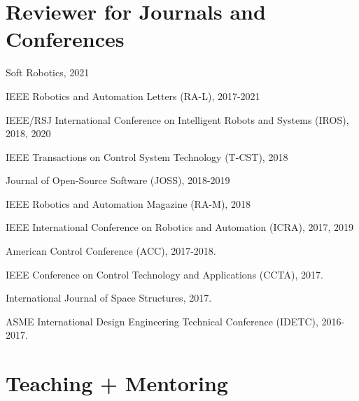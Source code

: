 \documentclass[letterpaper]{deedy-resume} %
\begin{document}
{\section{Reviewer for Journals and Conferences}



\vspace{0.4cm}

\begin{tightitemize}

\item Soft Robotics, 2021

\item IEEE Robotics and Automation Letters (RA-L), 2017-2021

\item IEEE/RSJ International Conference on Intelligent Robots and Systems (IROS), 2018, 2020

\item IEEE Transactions on Control System Technology (T-CST), 2018

\item Journal of Open-Source Software (JOSS), 2018-2019
  
\item IEEE Robotics and Automation Magazine (RA-M), 2018
  
\item IEEE International Conference on Robotics and Automation (ICRA), 2017, 2019

\item American Control Conference (ACC), 2017-2018.

\item IEEE Conference on Control Technology and Applications (CCTA), 2017.

\item International Journal of Space Structures, 2017.

\item ASME International Design Engineering Technical Conference (IDETC), 2016-2017.

\end{tightitemize}


\section{Teaching + Mentoring}

}
\end{document}
